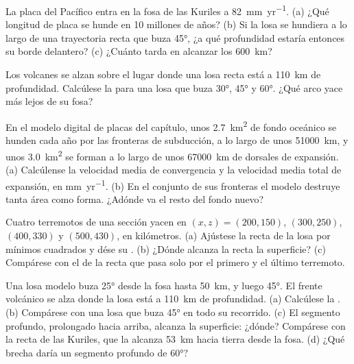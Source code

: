 \begin{exercise}[$\star$]\label{exo:b1:active-margins:2}
La placa del Pacífico entra en la fosa de las Kuriles a \qty{82}{mm.yr^{-1}}. (a) ¿Qué longitud de placa se hunde en 10 millones de años? (b) Si la losa
se hundiera a lo largo de una trayectoria recta que buza \ang{45}, ¿a qué profundidad estaría entonces su borde delantero? (c) ¿Cuánto tarda en
alcanzar los \qty{600}{km}?
\end{exercise}

\begin{exercise}[$\star$]\label{exo:b1:active-margins:3}
Los volcanes se alzan sobre el lugar donde una losa recta está a \qty{110}{km} de profundidad. Calcúlese la  para una losa que buza
\ang{30}, \ang{45} y \ang{60}. ¿Qué arco yace más lejos de su fosa?
\end{exercise}

\begin{exercise}[$\star$]\label{exo:b1:active-margins:4}
En el modelo digital de placas del capítulo, unos \qty{2.7}{km^2} de fondo oceánico se hunden cada año por las fronteras de subducción, a lo largo
de unos \qty{51000}{km}, y unos \qty{3.0}{km^2} se forman a lo largo de unos \qty{67000}{km} de dorsales de expansión.
(a) Calcúlense la velocidad media de convergencia y la velocidad media total de expansión, en \unit{mm.yr^{-1}}. (b) En el conjunto de sus fronteras
el modelo destruye tanta área como forma. ¿Adónde va el resto del fondo nuevo?
\end{exercise}

\begin{exercise}[$\star\star$]\label{exo:b1:active-margins:5}
Cuatro terremotos de una sección yacen en $(x, z) = (200, 150)$, $(300, 250)$, $(400, 330)$ y $(500, 430)$, en kilómetros. (a) Ajústese la recta de la
losa por mínimos cuadrados y dése su . (b) ¿Dónde alcanza la recta la superficie? (c) Compárese con el  de la recta que pasa solo
por el primero y el último terremoto.
\end{exercise}

\begin{exercise}[$\star\star$]\label{exo:b1:active-margins:6}
Una losa modelo buza \ang{25} desde la fosa hasta \qty{50}{km}, y luego \ang{45}. El frente volcánico se alza donde la losa está a \qty{110}{km} de
profundidad. (a) Calcúlese la . (b) Compárese con una losa que buza \ang{45} en todo su recorrido. (c) El segmento profundo,
prolongado hacia arriba, alcanza la superficie: ¿dónde? Compárese con la recta de las Kuriles, que la alcanza \qty{53}{km} hacia tierra desde la fosa.
(d) ¿Qué brecha daría un segmento profundo de \ang{60}?
\end{exercise}

